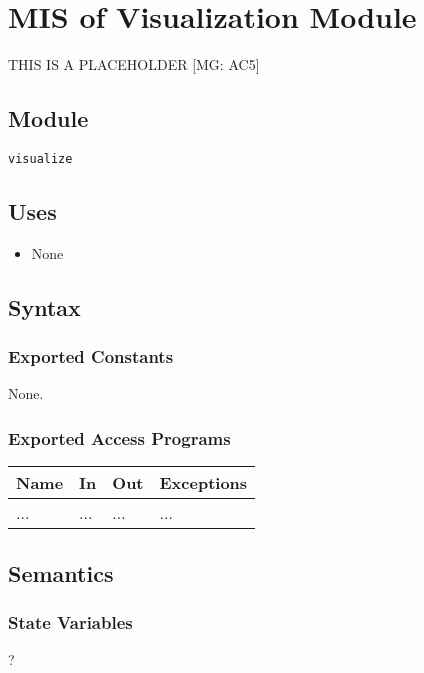 \documentclass[12pt, titlepage]{article}
\begin{document}
\newpage
\section{MIS of Visualization Module} \label{mVisual} 

THIS IS A PLACEHOLDER [MG: AC5]

\subsection{Module}
\texttt{visualize}

\subsection{Uses}
\begin{itemize}
\item None
\end{itemize}

\subsection{Syntax}

\subsubsection{Exported Constants}
None.

\subsubsection{Exported Access Programs}

\begin{center}
\begin{tabular}{p{2cm} p{5cm} p{3cm} p{4cm}}
\hline
\textbf{Name} & \textbf{In} & \textbf{Out} & \textbf{Exceptions} \\
\hline
... & ... & ... & ... \\
\hline
\end{tabular}
\end{center}

\subsection{Semantics}

\subsubsection{State Variables}
?
\end{document}
